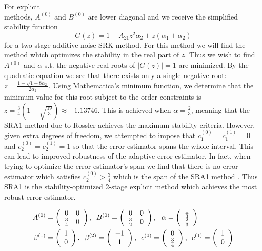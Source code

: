\documentclass{article}
\begin{document}
For explicit \\
methods, $A^{(0)}$ and $B^{(0)}$ are lower diagonal
and we receive the simplified stability function
\begin{equation}
G(z)=1+A_{21}z^{2}\alpha_{2}+z\left(\alpha_{1}+\alpha_{2}\right)\label{eq:SRA_stab_2}
\end{equation}
for a two-stage additive noise SRK method. For this method we will
find the method which optimizes the stability in the real part of
$z$. Thus we wish to find $A^{(0)}$ and $\alpha$ s.t. the negative
real roots of $\left|G(z)\right|=1$ are minimized. By the quadratic
equation we see that there exists only a single negative root: $z=\frac{1-\sqrt{1+8\alpha_{2}}}{2\alpha_{2}}$.
Using Mathematica's minimum function, we determine that the minimum
value for this root subject to the order constraints is $z=\frac{3}{4}\left(1-\sqrt{\frac{19}{3}}\right)\approx-1.13746$.
This is achieved when $\alpha=\frac{2}{3}$, meaning that the SRA1
method due to Rossler achieves the maximum stability criteria. However,
given extra degrees of freedom, we attempted to impose that $c_{1}^{(0)}=c_{1}^{(1)}=0$
and $c_{2}^{(0)}=c_{2}^{(1)}=1$ so that the error estimator spans
the whole interval. This can lead to improved robustness of the adaptive
error estimator. In fact, when trying to optimize the error estimator's
span we find that there is no error estimator which satisfies $c_{2}^{(0)}>\frac{3}{4}$
which is the span of the SRA1 method \cite{RN2707}. Thus SRA1 is
the stability-optimized 2-stage explicit method which achieves the
most robust error estimator.

\begin{align}
A^{(0)} & =\left(\begin{array}{cc}
0 & 0\\
\frac{3}{4} & 0
\end{array}\right),\thinspace\thinspace\thinspace B^{(0)}=\left(\begin{array}{cc}
0 & 0\\
\frac{3}{2} & 0
\end{array}\right),\thinspace\thinspace\thinspace\thinspace\alpha=\left(\begin{array}{c}
\frac{1}{3}\\
\frac{2}{3}
\end{array}\right)\nonumber \\
\beta^{(1)} & =\left(\begin{array}{c}
1\\
0
\end{array}\right),\thinspace\thinspace\thinspace\beta^{(2)}=\left(\begin{array}{c}
-1\\
1
\end{array}\right),\thinspace\thinspace\thinspace c^{(0)}=\left(\begin{array}{c}
0\\
\frac{3}{4}
\end{array}\right),\,\,\,c^{(1)}=\left(\begin{array}{c}
1\\
0
\end{array}\right)\label{eq:SRA1}
\end{align}
\end{document}
